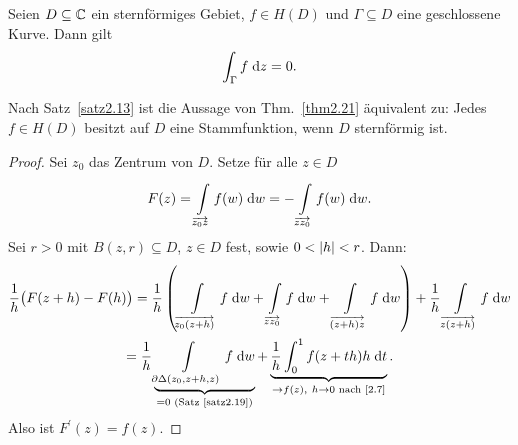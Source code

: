 \documentclass[a4paper,twoside,DIV15,BCOR12mm]{scrbook}
\begin{document}
\begin{center}
\end{center}

\begin{thm} \label{thm2.21}
  Seien $D\subseteq\mathbb{C}$ ein sternförmiges Gebiet, $f\in H(D)$ und $\Gamma\subseteq D$ eine geschlossene Kurve. Dann gilt
  \[\int_{\Gamma}^{}{f}\;\mathrm{d} z = 0.\]
\end{thm}
\begin{bem*}
  Nach Satz~\ref{satz2.13} ist die Aussage von Thm.~\ref{thm2.21} äquivalent zu: Jedes $f\in H(D)$ besitzt auf $D$ eine
  Stammfunktion, wenn $D$ sternförmig ist.
\end{bem*}
\begin{proof}
  Sei $z_0$ das Zentrum von $D$. Setze für alle $z\in D$
  \[F(z) = \int\limits_{\overrightarrow{z_0z}}^{}{f(w)}\;\mathrm{d}w = -\int\limits_{\overrightarrow{zz_0}}^{}{f(w)}\;\mathrm{d}w.\]
  Sei $r>0$ mit $B(z,r)\subseteq D$, $z\in D$ fest, sowie $0<\left\lvert h\right\lvert<r$. Dann:
  \begin{multline*} %
    \frac1h \bigl(F(z+h)-F(h)\bigr) = \frac1h \left( \Integral{\overrightarrow{z_0(z+h)}}{}{f}{w} +
      \Integral{\overrightarrow{zz_0}}{}{f}{w} + \Integral{\overrightarrow{(z+h)z}}{}{f}{w} \right) + \frac1h
    \Integral{\overrightarrow{z(z+h)}}{}{f}{w}  \\
    = \frac1h \underbrace{\Integral{\partial\Delta(z_0,z+h,z)}{}{f}{w}}_{=0 \text{ (Satz~\ref{satz2.19})}} + \underbrace{\frac1h
      \integral{0}{1}{f(z+th)h}{t}}_{\to f(z),\ h\to0 \text { nach \eqref{2.7}}}.
  \end{multline*}
  Also ist $F^\prime(z)=f(z)$.
\end{proof}
\end{document}
